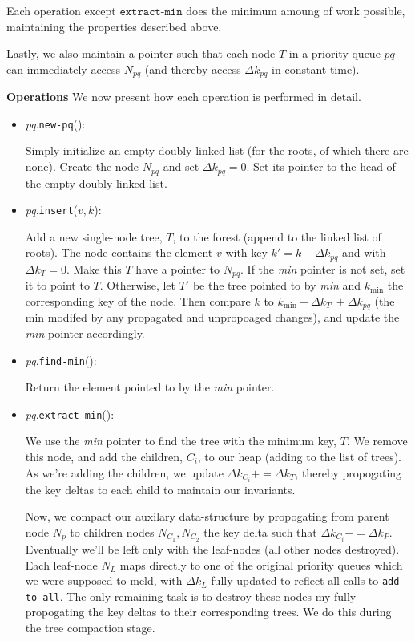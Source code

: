 \documentclass[12pt]{exam}
\begin{document}
\begin{questions}
\begin{solution}
Each operation except $\texttt{extract-min}$ does the minimum amoung of work possible, maintaining the properties described above.

Lastly, we also maintain a pointer such that each node $T$ in a priority queue $pq$ can immediately access $N_{pq}$ (and thereby access $\Delta k_{pq}$ in constant time).

\textbf{Operations}
We now present how each operation is performed in detail.

\begin{itemize}
  \item \textit{pq}.\texttt{new-pq}(): 

    Simply initialize an empty doubly-linked list (for the roots, of which there are none). Create the node $N_{pq}$ and set $\Delta k_{pq} = 0$. Set its pointer to the head of the empty doubly-linked list.

  \item \textit{pq}.\texttt{insert}($v,k$):

    Add a new single-node tree, $T$, to the forest (append to the linked list of roots). The node contains the element $v$ with key $k' = k - \Delta k_{pq}$ and with $\Delta k_T = 0$. Make this $T$ have a pointer to $N_{pq}$. If the \textit{min} pointer is not set, set it to point to $T$. Otherwise, let $T'$ be the tree pointed to by \textit{min} and $k_{\text{min}}$ the corresponding key of the node. Then compare $k$ to $k_{\text{min}} + \Delta k_{T'} + \Delta k_{pq}$ (the min modifed by any propagated and unpropoaged changes), and update the \textit{min} pointer accordingly.

  \item \textit{pq}.\texttt{find-min}():

    Return the element pointed to by the \textit{min} pointer.

  \item \textit{pq}.\texttt{extract-min}():

    We use the \textit{min} pointer to find the tree with the minimum key, $T$. We remove this node, and add the children, $C_i$, to our heap (adding to the list of trees). As we're adding the children, we update $\Delta k_{C_i} += \Delta k_{T}$, thereby propogating the key deltas to each child to maintain our invariants.


    Now, we compact our auxilary data-structure by propogating from parent node $N_p$ to children nodes $N_{C_1}, N_{C_2}$ the key delta such that $\Delta k_{C_i} += \Delta k_P$. Eventually we'll be left only with the leaf-nodes (all other nodes destroyed). Each leaf-node $N_L$ maps directly to one of the original priority queues which we were supposed to meld, with $\Delta k_{L}$ fully updated to reflect all calls to \texttt{add-to-all}. The only remaining task is to destroy these nodes my fully propogating the key deltas to their corresponding trees. We do this during the tree compaction stage.



\end{itemize}
\end{solution}
\end{questions}
\end{document}
